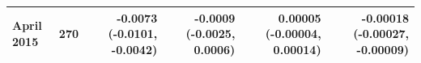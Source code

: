 \begin{tabular}{lrrrrr}
April 2015 & 270 & -0.0073 (-0.0101, -0.0042) & -0.0009 (-0.0025, 0.0006) & 0.00005 (-0.00004, 0.00014) & -0.00018 (-0.00027, -0.00009) \\
\bottomrule
\end{tabular}
